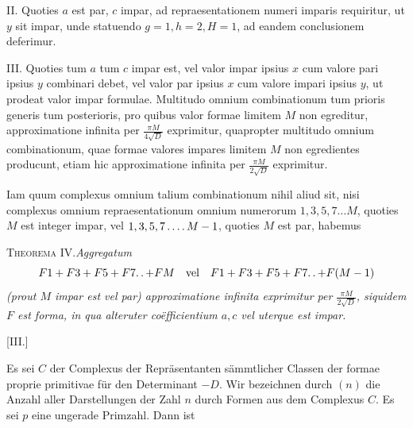 II. Quoties $a$ est par, $c$ impar, ad repraesentationem numeri imparis requiritur, ut $y$ sit impar, unde statuendo $g=1,h=2,H=1$, ad eandem conclusionem deferimur.

III. Quoties tum $a$ tum $c$ impar est, vel valor impar ipsius $x$ cum valore pari ipsius $y$ combinari debet, vel valor par ipsius $x$ cum valore impari ipsius $y$, ut prodeat valor impar formulae. Multitudo omnium combinationum tum prioris generis tum posterioris, pro quibus valor formae limitem $M$ non egreditur, approximatione infinita per $\frac{\pi M}{4\surd D}$ exprimitur, quapropter multitudo omnium combinationum, quae formae valores impares limitem $M$ non egredientes producunt, etiam hic approximatione infinita per $\frac{\pi M}{2\surd D}$ exprimitur.

Iam quum complexus omnium talium combinationum nihil aliud sit, nisi complexus omnium repraesentationum omnium numerorum $1,3,5,7\ldots M$, quoties $M$ est integer impar, vel $1,3,5,7\mathinner{.\,.\,.\,.} M-1$, quoties $M$ est par, habemus

\textsc{Theorema IV.}\quad\emph{Aggregatum}
\[
F1+F3+F5+F7\ldotp\ldotp+FM\quad\text{vel}\quad F1+F3+F5+F7\ldotp\ldotp+F(M-1)
\]
\emph{(prout $M$ impar est vel par) approximatione infinita exprimitur per $\frac{\pi M}{2\surd D}$, siquidem $F$ est forma, in qua alteruter coëfficientium $a,c$ vel uterque est impar.}

\par\bigskip{}\centerline{[III.]}\medskip
Es sei $C$ der Complexus der Repräsentanten sämmtlicher Classen der formae proprie primitivae für den Determinant $-D$. Wir bezeichnen durch $(n)$ die Anzahl aller Darstellungen der Zahl $n$ durch Formen aus dem Complexus $C$. Es sei $p$ eine ungerade Primzahl. Dann ist

